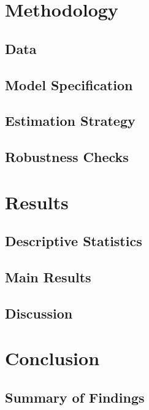 \documentclass[12pt,a4paper]{report}
\theoremstyle{definition}
\begin{document}
\chapter{Methodology}
\label{chap:methodology}

\section{Data}
\label{sec:data}

\section{Model Specification}
\label{sec:model}

\section{Estimation Strategy}
\label{sec:estimation}

\section{Robustness Checks}
\label{sec:robustness}

\chapter{Results}
\label{chap:results}

\section{Descriptive Statistics}
\label{sec:descriptive}

\section{Main Results}
\label{sec:main_results}

\section{Discussion}
\label{sec:discussion}

\chapter{Conclusion}
\label{chap:conclusion}

\section{Summary of Findings}
\label{sec:summary}
\end{document}
